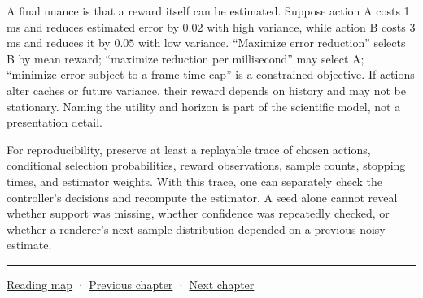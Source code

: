 A final nuance is that a reward itself can be estimated. Suppose action A costs 1 ms and reduces estimated error by \(0.02\) with high variance, while action B costs 3 ms and reduces it by \(0.05\) with low variance. ``Maximize error reduction'' selects B by mean reward; ``maximize reduction per millisecond'' may select A; ``minimize error subject to a frame-time cap'' is a constrained objective. If actions alter caches or future variance, their reward depends on history and may not be stationary. Naming the utility and horizon is part of the scientific model, not a presentation detail.

For reproducibility, preserve at least a replayable trace of chosen actions, conditional selection probabilities, reward observations, sample counts, stopping times, and estimator weights. With this trace, one can separately check the controller's decisions and recompute the estimator. A seed alone cannot reveal whether support was missing, whether confidence was repeatedly checked, or whether a renderer's next sample distribution depended on a previous noisy estimate.

\begin{center}\rule{0.5\linewidth}{0.5pt}\end{center}

\href{Chapter\%20Edition/01\%20-\%20Computing\%20Foundations/00\%20-\%20Reading\%20Map}{Reading map} · \hyperref[02-foundations-ii-ch028]{Previous chapter} · \hyperref[02-foundations-ii-ch030]{Next chapter}
